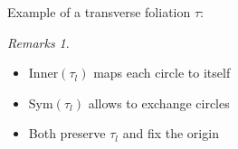 \documentclass[hyperref={pdfpagelabels=false}]{beamer}
\theoremstyle{plain}
\theoremstyle{remark}
\newtheorem*{remark}{Remarks}
\begin{document}
\begin{frame}{Example of a transverse foliation $\tau$:}
\begin{minipage}[]{0.45\textwidth}
\begin{figure}
\end{figure}
\end{minipage}
\hfill
\begin{minipage}[]{0.45\textwidth}
\begin{remark}
\begin{itemize}
	\item $\mathup{Inner}(\tau_l)$ maps each circle to itself
	\item $\mathup{Sym}(\tau_l)$ allows to exchange circles
	\item Both preserve $\tau_l$ and fix the origin
\end{itemize}
\end{remark}
\end{minipage}
\end{frame}
\end{document}
